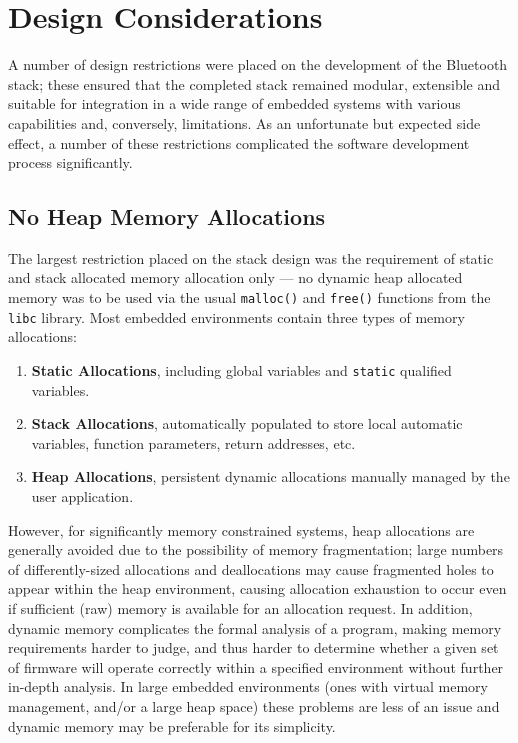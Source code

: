 \section{Design Considerations}

A number of design restrictions were placed on the development of the Bluetooth stack; these ensured that the completed stack remained modular, extensible and suitable for integration in a wide range of embedded systems with various capabilities and, conversely, limitations. As an unfortunate but expected side effect, a number of these restrictions complicated the software development process significantly.

\FloatBarrier
\subsection{No Heap Memory Allocations}

The largest restriction placed on the stack design was the requirement of static and stack allocated memory allocation only --- no dynamic heap allocated memory was to be used via the usual \lstinline{malloc()} and \lstinline{free()} functions from the \texttt{libc} library. Most embedded environments contain three types of memory allocations:

\begin{enumerate}
	\item \textbf{Static Allocations}, including global variables and \lstinline{static} qualified variables.
	\item \textbf{Stack Allocations}, automatically populated to store local automatic variables, function parameters, return addresses, etc.
	\item \textbf{Heap Allocations}, persistent dynamic allocations manually managed by the user application.
\end{enumerate}

However, for significantly memory constrained systems, heap allocations are generally avoided due to the possibility of memory fragmentation; large numbers of differently-sized allocations and deallocations may cause fragmented holes to appear within the heap environment, causing allocation exhaustion to occur even if sufficient (raw) memory is available for an allocation request. In addition, dynamic memory complicates the formal analysis of a program, making memory requirements harder to judge, and thus harder to determine whether a given set of firmware will operate correctly within a specified environment without further in-depth analysis. In large embedded environments (ones with virtual memory management, and/or a large heap space) these problems are less of an issue and dynamic memory may be preferable for its simplicity.

